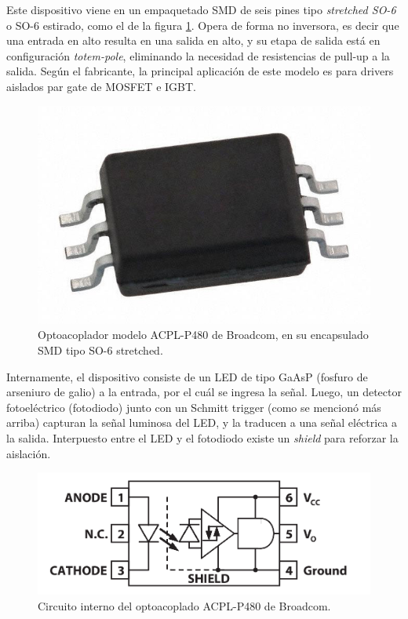 Este dispositivo viene en un empaquetado SMD de seis pines tipo \textit{stretched SO-6} o SO-6 estirado, como el de la figura \ref{encapsulado_opto}. Opera de forma no inversora, es decir que una entrada en alto resulta en una salida en alto, y su etapa de salida está en configuración \textit{totem-pole}, eliminando la necesidad de resistencias de pull-up a la salida. Según el fabricante, la principal aplicación de este modelo es para drivers aislados par gate de MOSFET e IGBT.\\

\begin{figure}[h]
    \centering
    \includegraphics[scale=0.2]{Imagenes/SO6 Stretched.jpeg}
    \caption{Optoacoplador modelo ACPL-P480 de Broadcom, en su encapsulado SMD tipo SO-6 stretched.}
    \label{encapsulado_opto}
\end{figure}

Internamente, el dispositivo consiste de un LED de tipo GaAsP (fosfuro de arseniuro de galio) a la entrada, por el cuál se ingresa la señal. Luego, un detector fotoeléctrico (fotodiodo) junto con un Schmitt trigger (como se mencionó más arriba) capturan la señal luminosa del LED, y la traducen a una señal eléctrica a la salida. Interpuesto entre el LED y el fotodiodo existe un \textit{shield} para reforzar la aislación.\\

\begin{figure}[h]
    \centering
    \includegraphics[scale=0.9]{Imagenes/ACPL-P480.png}
    \caption{Circuito interno del optoacoplado ACPL-P480 de Broadcom.}
    \label{circ_interno_opto}
\end{figure}


